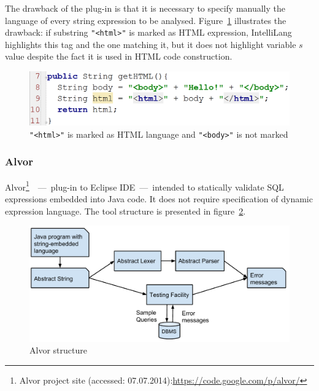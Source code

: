 \documentclass{acm_proc_article-sp}
\begin{document}
The drawback of the plug-in is that it is necessary to specify manually the language of every string expression to be analysed. Figure~\ref{IDEA_html} illustrates the drawback: if substring \verb|"<html>"| is marked as HTML expression, IntelliLang highlights this tag and the one matching it, but it does not highlight variable $s$ value despite the fact it is used in HTML code construction. \newline 

\begin{figure}[h!]
    \begin{center}
        \includegraphics[scale=0.25]{graphics/IDEA_html.png}
    \end{center}
    \caption{\texttt{"<html>"} is marked as HTML language and \texttt{"<body>"} is not marked}
    \label{IDEA_html}
\end{figure} 


\subsubsection{Alvor}

Alvor\footnote{Alvor project site (accessed: 07.07.2014):\url{https://code.google.com/p/alvor/}}~\cite{ALVOR1}~---~plug-in to Eclipse IDE~---~intended to statically validate SQL expressions embedded into Java code. It does not require specification of dynamic expression language. The tool structure is presented in figure~\ref{alvor_structure}.

\begin{figure}[h!]
    \begin{center}
        \includegraphics[scale=0.4]{graphics/Alvor.pdf}
    \end{center}
    \caption{Alvor structure}
    \label{alvor_structure}
\end{figure}
\end{document}
